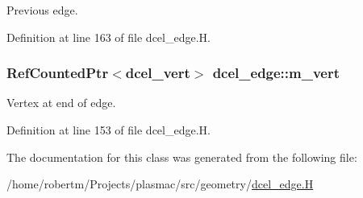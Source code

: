 Previous edge. 



Definition at line 163 of file dcel\+\_\+edge.\+H.

\subsubsection[{\texorpdfstring{m\+\_\+vert}{m_vert}}]{\setlength{\rightskip}{0pt plus 5cm}Ref\+Counted\+Ptr$<${\bf dcel\+\_\+vert}$>$ dcel\+\_\+edge\+::m\+\_\+vert\hspace{0.3cm}{\ttfamily [protected]}}\hypertarget{classdcel__edge_ad4b3ec662a3dd8290f0514577605577d}{}\label{classdcel__edge_ad4b3ec662a3dd8290f0514577605577d}


Vertex at end of edge. 



Definition at line 153 of file dcel\+\_\+edge.\+H.



The documentation for this class was generated from the following file\+:\begin{DoxyCompactItemize}
\item 
/home/robertm/\+Projects/plasmac/src/geometry/\hyperlink{dcel__edge_8H}{dcel\+\_\+edge.\+H}\end{DoxyCompactItemize}
